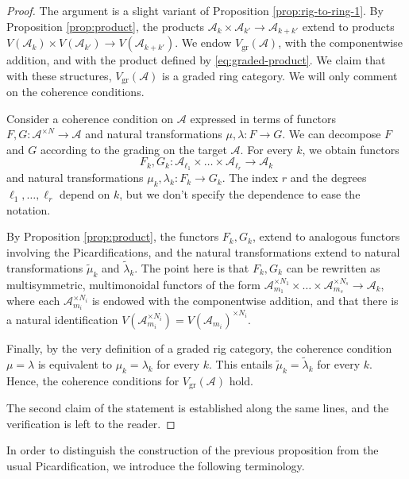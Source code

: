 \documentclass[11pt]{article}
\theoremstyle{plain}
\theoremstyle{definition}
\newcommand{\Acal}{\mathcal A}
\begin{document}
\begin{proof}
The argument is a slight variant of Proposition \ref{prop:rig-to-ring-1}. By Proposition \ref{prop:product}, the products $\Acal_{k}\times\Acal_{k'}\to\Acal_{k+k'}$ extend to products $V(\Acal_{k})\times V(\Acal_{k'})\to V(\Acal_{k+k'})$. We endow $V_{\mathrm{gr}}(\Acal)$, with the componentwise addition, and with the product defined by \eqref{eq:graded-product}. We claim that with these structures, $V_{\mathrm{gr}}(\Acal)$ is a graded ring category. We will only comment on the coherence conditions.

Consider a coherence condition on $\Acal$ expressed in terms of functors $F,G\colon\Acal^{\times N}\to\Acal$ and natural transformations $\mu,\lambda\colon F\to G$. We can decompose $F$ and $G$ according to the grading on the target $\Acal$. For every $k$, we obtain functors\vspace*{-3pt}\enlargethispage{.5\baselineskip}
\[
F_{k},G_{k}\colon \Acal_{\ell_{1}}\times\ldots\times\Acal_{\ell_{r}}\to\Acal_{k}
\]
and natural transformations $\mu_{k},\lambda_{k}\colon F_{k}\to G_{k}$. The index $r$ and the degrees $\ell_{1},\ldots,\ell_{r}$ depend on $k$, but we don't specify the dependence to ease the notation.

By Proposition \ref{prop:product}, the functors $F_{k}, G_{k}$, extend to analogous functors involving the Picardifications, and the natural transformations extend to natural transformations $\widetilde{\mu}_{k}$ and $\widetilde{\lambda}_{k}$. The point here is that $F_{k}, G_{k}$ can be rewritten as multisymmetric, multimonoidal functors of the form $\Acal_{m_{1}}^{\times N_{1}}\times\ldots\times\Acal_{m_{s}}^{\times N_{s}}\to\Acal_{k}$, where each $\Acal_{m_{i}}^{\times N_{i}}$ is endowed with the componentwise addition, and that there is a natural identification $V(\Acal_{m_{i}}^{\times N_{i}})=V(\Acal_{m_{i}})^{\times N_{i}}$.

Finally, by the very definition of a graded rig category, the coherence condition $\mu=\lambda$ is equivalent to $\mu_{k}=\lambda_{k}$ for every $k$. This entails $\widetilde{\mu}_{k}=\widetilde{\lambda}_{k}$ for every $k$. Hence, the coherence conditions for $V_{\mathrm{gr}}(\Acal)$ hold.

The second claim of the statement is established along the same lines, and the verification is left to the reader.
\end{proof}

In order to distinguish the construction of the previous proposition from the usual Picardification, we introduce the following terminology.
\end{document}
